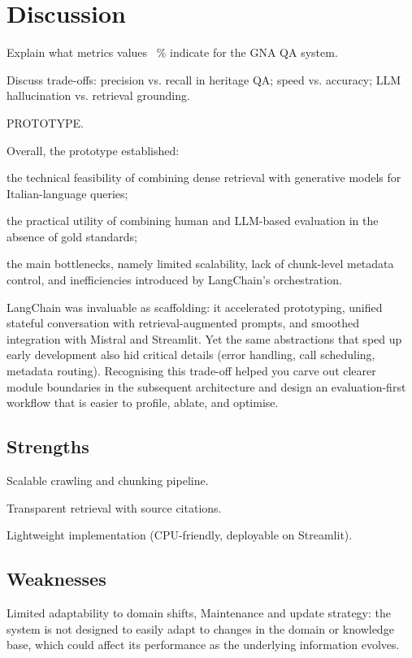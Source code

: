 \chapter{Discussion}
\label{chap:discussion}
\begin{spacing}{1.5}

Explain what metrics values ~\% indicate for the GNA QA system.

Discuss trade-offs: precision vs. recall in heritage QA; speed vs. accuracy; LLM hallucination vs. retrieval grounding.

PROTOTYPE.

Overall, the prototype established:

the technical feasibility of combining dense retrieval with generative models for Italian-language queries;

the practical utility of combining human and LLM-based evaluation in the absence of gold standards;

the main bottlenecks, namely limited scalability, lack of chunk-level metadata control, and inefficiencies introduced by LangChain’s orchestration.

LangChain was invaluable as scaffolding: it accelerated prototyping, unified stateful conversation with retrieval-augmented prompts, and smoothed integration with Mistral and Streamlit. Yet the same abstractions that sped up early development also hid critical details (error handling, call scheduling, metadata routing). Recognising this trade-off helped you carve out clearer module boundaries in the subsequent architecture and design an evaluation-first workflow that is easier to profile, ablate, and optimise.

\section{Strengths}
Scalable crawling and chunking pipeline.

Transparent retrieval with source citations.

Lightweight implementation (CPU-friendly, deployable on Streamlit).

\section{Weaknesses}

Limited adaptability to domain shifts, Maintenance and update strategy: the system is not designed to easily adapt to changes in the domain or knowledge base, which could affect its performance as the underlying information evolves.


\end{spacing}
